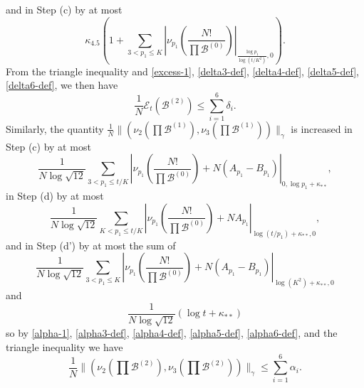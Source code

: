 \documentclass[10pt,a4paper,reqno]{amsart}
\numberwithin{equation}{section}
\theoremstyle{plain}
\theoremstyle{definition}
\newcommand\tuple{{\mathcal B}}
\newcommand\excess{{\mathcal{E}}}
\begin{document}
and in Step (c) by at most
$$ \kappa_{4.5} \left(1 + \sum_{3 < p_1 \leq K} \left|\nu_{p_1}\left( \frac{N!}{\prod \tuple^{(0)}} \right) \right|_{\frac{\log p_1}{\log(t/K^2)},0}\right).$$
From the triangle inequality and \eqref{excess-1}, \eqref{delta3-def}, \eqref{delta4-def}, \eqref{delta5-def}, \eqref{delta6-def}, we then have
\begin{equation}\label{excess-2}
   \frac{1}{N} \excess_t(\tuple^{(2)}) \leq \sum_{i=1}^6 \delta_i.
\end{equation}
Similarly, the quantity $\frac{1}{N} \| (\nu_2(\prod \tuple^{(1)}),\nu_3(\prod \tuple^{(1)}))\|_\gamma$ is increased in Step (c) by at most
$$\frac{1}{N\log \sqrt{12}} \sum_{3 < p_1 \leq t/K} \left|\nu_{p_1}\left( \frac{N!}{\prod \tuple^{(0)}} \right) + N(A_{p_1} - B_{p_1}) \right|_{0,\log p_1 + \kappa_{**}},$$
in Step (d) by at most
$$\frac{1}{N\log \sqrt{12}} \sum_{K < p_1 \leq t/K} \left|\nu_{p_1}\left( \frac{N!}{\prod \tuple^{(0)}} \right) + NA_{p_1} \right|_{\log(t/p_1) + \kappa_{**},0},$$
and in Step (d') by at most the sum of
$$\frac{1}{N\log \sqrt{12}} \sum_{3 < p_1 \leq K} \left|\nu_{p_1}\left( \frac{N!}{\prod \tuple^{(0)}} \right) + N(A_{p_1}-B_{p_1}) \right|_{\log(K^2) + \kappa_{**},0}$$
and
$$\frac{1}{N\log \sqrt{12}} \left( \log t + \kappa_{**} \right)$$
so by \eqref{alpha-1}, \eqref{alpha3-def}, \eqref{alpha4-def}, \eqref{alpha5-def}, \eqref{alpha6-def}, and the triangle inequality we have
\begin{equation}\label{alpha-2}
\frac{1}{N} \| (\nu_2(\prod \tuple^{(2)}), \nu_3(\prod \tuple^{(2)})) \|_\gamma \leq \sum_{i=1}^6 \alpha_i.
\end{equation}
\end{document}
